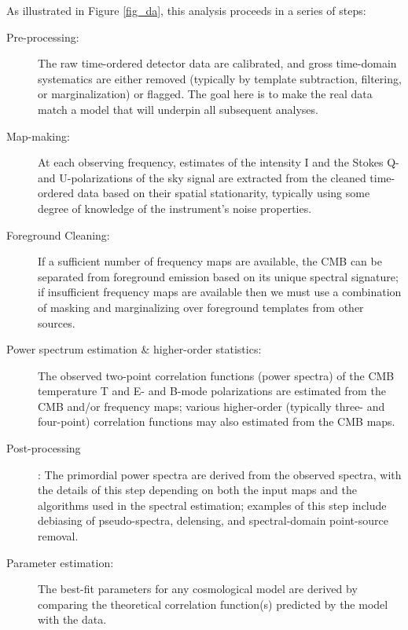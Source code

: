 As illustrated in Figure \ref{fig_da}, this analysis proceeds in a series of steps:
\begin{description}
\item[ Pre-processing:] The raw time-ordered detector data are calibrated, and gross time-domain systematics are either removed (typically by template subtraction, filtering, or marginalization) or flagged. The goal here is to make the real data match a model that will underpin all subsequent analyses.
\item[Map-making:] At each observing frequency, estimates of the intensity I and the Stokes Q- and U-polarizations of the sky signal are extracted from the cleaned time-ordered data based on their spatial stationarity, typically using some degree of knowledge of the instrument's noise properties.
\item[Foreground Cleaning:] If a sufficient number of frequency maps are available, the CMB can be separated from foreground emission based on its unique spectral signature; if insufficient frequency maps are available then we must use a combination of masking and marginalizing over foreground templates from other sources.
\item[Power spectrum estimation \& higher-order statistics:] The observed two-point correlation functions (power spectra) of the CMB temperature T and E- and B-mode polarizations are estimated from the CMB and/or frequency maps; various higher-order (typically three- and four-point) correlation functions may also estimated from the CMB maps.
\item[Post-processing]: The primordial power spectra are derived from the observed spectra, with the details of this step depending on both the input maps and the algorithms used in the spectral estimation; examples of this step include debiasing of pseudo-spectra, delensing, and spectral-domain point-source removal.
\item[Parameter estimation:] The best-fit parameters for any cosmological model are derived by comparing the theoretical correlation function(s) predicted by the model with the data.
\end{description}

